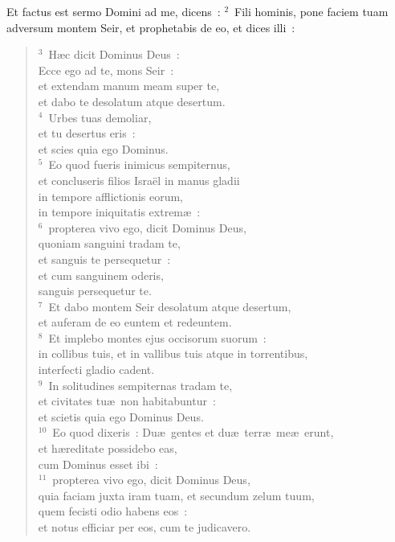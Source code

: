 \bchapter
\lettrine[lines=3,image=true,loversize=0.05,lraise=-0.03]{E}{}t factus est sermo Domini ad me, dicens~:
${}^{2}$~Fili hominis, pone faciem tuam adversum montem Seir, et prophetabis de eo, et dices illi~:
\begin{flushleft}\begin{verse}${}^{3}$~H\ae c dicit Dominus Deus~:\\ Ecce ego ad te, mons Seir~:\\ et extendam manum meam super te,\\ et dabo te desolatum atque desertum.\\
${}^{4}$~Urbes tuas demoliar,\\ et tu desertus eris~:\\ et scies quia ego Dominus.\\
${}^{5}$~Eo quod fueris inimicus sempiternus,\\ et concluseris filios Isra\"el in manus gladii\\ in tempore afflictionis eorum,\\ in tempore iniquitatis extrem\ae~:\\
${}^{6}$~propterea vivo ego, dicit Dominus Deus,\\ quoniam sanguini tradam te,\\ et sanguis te persequetur~:\\ et cum sanguinem oderis,\\ sanguis persequetur te.\\
${}^{7}$~Et dabo montem Seir desolatum atque desertum,\\ et auferam de eo euntem et redeuntem.\\
${}^{8}$~Et implebo montes ejus occisorum suorum~:\\ in collibus tuis, et in vallibus tuis atque in torrentibus,\\ interfecti gladio cadent.\\
${}^{9}$~In solitudines sempiternas tradam te,\\ et civitates tu\ae\ non habitabuntur~:\\ et scietis quia ego Dominus Deus.\\
${}^{10}$~Eo quod dixeris~: Du\ae\ gentes et du\ae\ terr\ae\ me\ae\ erunt,\\ et h\ae reditate possidebo eas,\\ cum Dominus esset ibi~:\\
${}^{11}$~propterea vivo ego, dicit Dominus Deus,\\ quia faciam juxta iram tuam, et secundum zelum tuum,\\ quem fecisti odio habens eos~:\\ et notus efficiar per eos, cum te judicavero.\\

\end{verse}
\end{flushleft}
